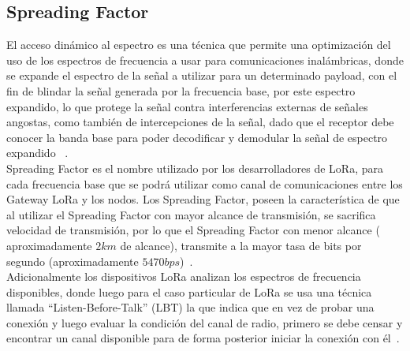 \begin{justify}
\subsection{Spreading Factor}
El acceso dinámico al espectro es una técnica que permite una optimización del uso de los espectros de frecuencia a usar para comunicaciones inalámbricas, donde se expande el espectro de la señal a utilizar para un determinado payload, con el fin de blindar la señal generada por la frecuencia base, por este espectro expandido, lo que protege la señal contra interferencias externas de señales angostas, como también de intercepciones de la señal, dado que el receptor debe conocer la banda base para poder decodificar y demodular la señal de espectro expandido ~\cite{modulation}.\\
Spreading Factor es el nombre utilizado por los desarrolladores de LoRa, para cada frecuencia base que se podrá utilizar como canal de comunicaciones entre los Gateway LoRa y los nodos. Los Spreading Factor, poseen la característica de que al utilizar el Spreading Factor con mayor alcance de transmisión, se sacrifica velocidad de transmisión, por lo que el Spreading Factor con menor alcance ( aproximadamente $2km$ de alcance), transmite a la mayor tasa de bits por segundo (aproximadamente $5470bps$)~\cite{orange}.\\
Adicionalmente los dispositivos LoRa analizan los espectros de frecuencia disponibles, donde luego para el caso particular de LoRa se usa una técnica llamada ``Listen-Before-Talk'' (LBT) la que indica que en vez de probar una conexión y luego evaluar la condición del canal de radio, primero se debe censar y encontrar un canal disponible para de forma posterior iniciar la conexión con él~\cite{modulation}.

\end{justify}
